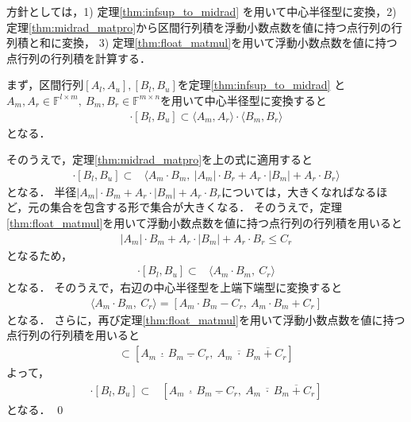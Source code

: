 \begin{Proof}
	方針としては，1) 定理\ref{thm:infsup_to_midrad} を用いて中心半径型に変換，2) 定理\ref{thm:midrad_matpro}から区間行列積を浮動小数点数を値に持つ点行列の行列積と和に変換， 3) 定理\ref{thm:float_matmul}を用いて浮動小数点数を値に持つ点行列の行列積を計算する．
	
	まず，区間行列$[A_l, A_u], [B_l, B_u]$を定理\ref{thm:infsup_to_midrad} と$A_m, A_r \in  {\mathbb F}^{l \times m}, ~ B_m, B_r \in {\mathbb F}^{m \times n} $を用いて中心半径型に変換すると
	\begin{align*}
		[A_l, A_u] \cdot  [B_l, B_u ] \subset \langle A_m, A_r \rangle \cdot \langle B_m, B_r \rangle
	\end{align*}
	となる．
	
	そのうえで，定理\ref{thm:midrad_matpro}を上の式に適用すると
		\begin{align*}
			[A_l, A_u] \cdot  [B_l, B_u ] \subset& \langle A_m \cdot B_m, ~ | A_m | \cdot B_r + A_r \cdot | B_m | + A_r \cdot B_r \rangle
		\end{align*}
	となる．
	半径$| A_m | \cdot B_m + A_r \cdot | B_m | + A_r \cdot B_r$については，大きくなればなるほど，元の集合を包含する形で集合が大きくなる．
	そのうえで，定理\ref{thm:float_matmul}を用いて浮動小数点数を値に持つ点行列の行列積を用いると
		\begin{align*}
			| A_m | \cdot B_m + A_r \cdot | B_m | + A_r \cdot B_r \le C_r
		\end{align*}
	となるため，
		\begin{align*}
			[A_l, A_u] \cdot  [B_l, B_u ] \subset& \langle A_m \cdot B_m, ~ C_r \rangle
		\end{align*}
	となる．
	そのうえで，右辺の中心半径型を上端下端型に変換すると
		\begin{align*}
			\langle A_m \cdot B_m, ~ C_r \rangle = [ A_m \cdot B_m - C_r, ~ A_m \cdot B_m + C_r ]
		\end{align*}
	となる．
	さらに，再び定理\ref{thm:float_matmul}を用いて浮動小数点数を値に持つ点行列の行列積を用いると
		\begin{align*}
			[ A_m \cdot B_m - C_r, ~ A_m \cdot B_m + C_r ] \subset [ A_m  ~ \underline{\cdot} ~ B_m  ~ \underline{-} ~ C_r, ~ A_m ~ \overline{\cdot} ~ B_m ~ \overline{+} ~ C_r ]
		\end{align*}
	よって，
		\begin{align*}
			[A_l, A_u] \cdot  [B_l, B_u ] \subset& [ A_m  ~ \underline{\cdot} ~ B_m  ~ \underline{-} ~ C_r, ~ A_m ~ \overline{\cdot} ~ B_m ~ \overline{+} ~ C_r ]
		\end{align*}
	となる．
\qed
\end{Proof}

